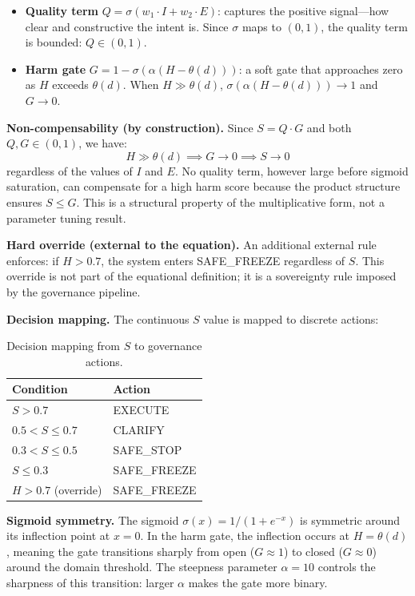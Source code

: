 \documentclass[11pt]{article}
\begin{document}
\begin{itemize}[nosep,leftmargin=*]
\item \textbf{Quality term} $Q = \sigma(w_1 \cdot I + w_2 \cdot E)$: captures the positive signal---how clear and constructive the intent is.
Since $\sigma$ maps to $(0,1)$, the quality term is bounded: $Q \in (0,1)$.
\item \textbf{Harm gate} $G = 1 - \sigma(\alpha(H - \theta(d)))$: a soft gate that approaches zero as $H$ exceeds $\theta(d)$.
When $H \gg \theta(d)$, $\sigma(\alpha(H - \theta(d))) \to 1$ and $G \to 0$.
\end{itemize}

\textbf{Non-compensability (by construction).}
Since $S = Q \cdot G$ and both $Q, G \in (0,1)$, we have:
\[
H \gg \theta(d) \implies G \to 0 \implies S \to 0
\]
regardless of the values of $I$ and $E$.
No quality term, however large before sigmoid saturation, can compensate for a high harm score because the product structure ensures $S \leq G$.
This is a structural property of the multiplicative form, not a parameter tuning result.

\textbf{Hard override (external to the equation).}
An additional external rule enforces: if $H > 0.7$, the system enters SAFE\_FREEZE regardless of $S$.
This override is not part of the equational definition; it is a sovereignty rule imposed by the governance pipeline.

\textbf{Decision mapping.}
The continuous $S$ value is mapped to discrete actions:

\begin{table}[h]
\centering
\small
\begin{tabular}{@{}ll@{}}
\toprule
\textbf{Condition} & \textbf{Action} \\
\midrule
$S > 0.7$ & EXECUTE \\
$0.5 < S \leq 0.7$ & CLARIFY \\
$0.3 < S \leq 0.5$ & SAFE\_STOP \\
$S \leq 0.3$ & SAFE\_FREEZE \\
$H > 0.7$ (override) & SAFE\_FREEZE \\
\bottomrule
\end{tabular}
\caption{Decision mapping from $S$ to governance actions.}
\label{tab:decisions}
\end{table}

\textbf{Sigmoid symmetry.}
The sigmoid $\sigma(x) = 1/(1+e^{-x})$ is symmetric around its inflection point at $x{=}0$.
In the harm gate, the inflection occurs at $H = \theta(d)$, meaning the gate transitions sharply from open ($G \approx 1$) to closed ($G \approx 0$) around the domain threshold.
The steepness parameter $\alpha{=}10$ controls the sharpness of this transition: larger $\alpha$ makes the gate more binary.
\end{document}
